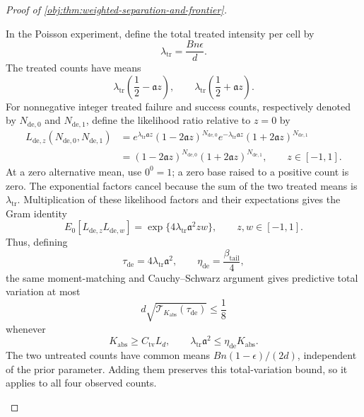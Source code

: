 \documentclass[11pt]{article}
\begin{document}
\begin{proof}[Proof of \cref{obj:thm:weighted-separation-and-frontier}]
\begin{enumerate}
In the Poisson experiment, define the total treated intensity per cell by
\[
\lambda_{\mathrm{tr}}=\frac{Bn\epsilon}{d}.
\]
The treated counts have means
\[
\lambda_{\mathrm{tr}}\left(\frac12-\mathfrak a z\right),
\qquad
\lambda_{\mathrm{tr}}\left(\frac12+\mathfrak a z\right).
\]
For nonnegative integer treated failure and success counts, respectively denoted by \(N_{\mathrm{de},0}\) and \(N_{\mathrm{de},1}\), define the likelihood ratio relative to \(z=0\) by
\[
\begin{aligned}
L_{\mathrm{de},z}(N_{\mathrm{de},0},N_{\mathrm{de},1})
&=e^{\lambda_{\mathrm{tr}}\mathfrak a z}
 (1-2\mathfrak a z)^{N_{\mathrm{de},0}}
 e^{-\lambda_{\mathrm{tr}}\mathfrak a z}
 (1+2\mathfrak a z)^{N_{\mathrm{de},1}}\\
&=(1-2\mathfrak a z)^{N_{\mathrm{de},0}}
  (1+2\mathfrak a z)^{N_{\mathrm{de},1}},
\qquad z\in[-1,1].
\end{aligned}
\]
At a zero alternative mean, use \(0^0=1\); a zero base raised to a positive count is zero. The exponential factors cancel because the sum of the two treated means is \(\lambda_{\mathrm{tr}}\). Multiplication of these likelihood factors and their expectations gives the Gram identity
\[
E_0[L_{\mathrm{de},z}L_{\mathrm{de},w}]
=\exp\{4\lambda_{\mathrm{tr}}\mathfrak a^2zw\},
\qquad z,w\in[-1,1].
\]
Thus, defining
\[
\tau_{\mathrm{de}}=4\lambda_{\mathrm{tr}}\mathfrak a^2,
\qquad
\eta_{\mathrm{de}}=\frac{\beta_{\mathrm{tail}}}{4},
\]
the same moment-matching and Cauchy--Schwarz argument gives predictive total variation at most
\[
d\sqrt{\mathcal T_{K_{\mathrm{abs}}}(\tau_{\mathrm{de}})}
\le\frac18
\]
whenever
\[
K_{\mathrm{abs}}\ge C_{\mathrm{tv}}L_d,
\qquad
\lambda_{\mathrm{tr}}\mathfrak a^2
\le\eta_{\mathrm{de}}K_{\mathrm{abs}}.
\]
The two untreated counts have common means
\(Bn(1-\epsilon)/(2d)\), independent of the prior parameter. Adding them preserves this total-variation bound, so it applies to all four observed counts.


\end{enumerate}
\end{proof}
\end{document}
